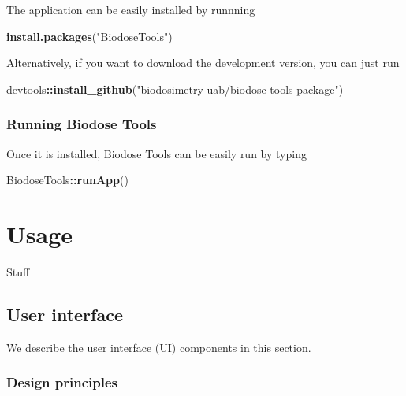 \documentclass[]{scrartcl}
\newenvironment{Shaded}{\begin{snugshade}}{\end{snugshade}}
\newcommand{\KeywordTok}[1]{\textcolor[rgb]{0.13,0.29,0.53}{\textbf{#1}}}
\newcommand{\NormalTok}[1]{#1}
\newcommand{\OperatorTok}[1]{\textcolor[rgb]{0.81,0.36,0.00}{\textbf{#1}}}
\newcommand{\StringTok}[1]{\textcolor[rgb]{0.31,0.60,0.02}{#1}}
\begin{document}
The application can be easily installed by runnning

\begin{Shaded}
\begin{Highlighting}[]
\KeywordTok{install.packages}\NormalTok{(}\StringTok{"BiodoseTools"}\NormalTok{)}
\end{Highlighting}
\end{Shaded}

Alternatively, if you want to download the development version, you can just run

\begin{Shaded}
\begin{Highlighting}[]
\NormalTok{devtools}\OperatorTok{::}\KeywordTok{install_github}\NormalTok{(}\StringTok{"biodosimetry-uab/biodose-tools-package"}\NormalTok{)}
\end{Highlighting}
\end{Shaded}

\hypertarget{running-biodose-tools}{%
\subsubsection{Running Biodose Tools}\label{running-biodose-tools}}

Once it is installed, Biodose Tools can be easily run by typing

\begin{Shaded}
\begin{Highlighting}[]
\NormalTok{BiodoseTools}\OperatorTok{::}\KeywordTok{runApp}\NormalTok{()}
\end{Highlighting}
\end{Shaded}

\hypertarget{manual}{%
\section{Usage}\label{manual}}

Stuff

\hypertarget{manual-ui}{%
\subsection{User interface}\label{manual-ui}}

We describe the user interface (UI) components in this section.

\hypertarget{design-principles}{%
\subsubsection{Design principles}\label{design-principles}}
\end{document}
